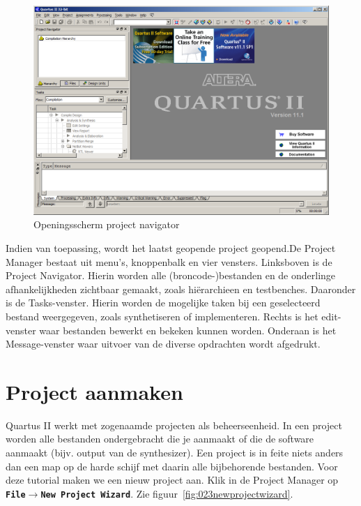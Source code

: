 \documentclass[a4paper,12pt,fleqn,twoside]{book}
\def\tutpicscale{0.455}
\newcommand{\menu}[1]{\texttt{\textbf{#1}}}
\def\pijl{$\rightarrow$}%
\begin{document}
\begin{figure}[H]
\centering
\includegraphics[scale=\tutpicscale]{022projectnavafterstartup.png}
\caption{Openingsscherm project navigator}
\label{fig:022projectnavafterstartup}
\end{figure}

Indien van toepassing, wordt het laatst geopende project geopend.De Project
Manager bestaat uit menu's, knoppenbalk en vier vensters. Linksboven is de
Project Navigator. Hierin worden alle (broncode-)bestanden en de onderlinge 
afhankelijkheden zichtbaar gemaakt, zoals hi\"{e}rarchieen en testbenches.
Daaronder is de Tasks-venster. Hierin worden de mogelijke taken bij een
geselecteerd bestand weergegeven, zoals synthetiseren of implementeren. Rechts
is het edit-venster waar bestanden bewerkt en bekeken kunnen worden. Onderaan
is het Message-venster waar uitvoer van de diverse opdrachten wordt afgedrukt.

\section{Project aanmaken}
\label{sec:projectaanmaken}
Quartus II werkt met zogenaamde projecten als beheerseenheid. In een project
worden alle bestanden ondergebracht die je aanmaakt of die de software
aanmaakt (bijv. output van de synthesizer). Een project is in feite niets
anders dan een map op de harde schijf met daarin alle bijbehorende bestanden.
Voor deze tutorial maken we een nieuw project aan. Klik in de Project Manager
op \menu{File\pijl{}New Project Wizard}.
Zie figuur~\ref{fig:023newprojectwizard}.
 
\end{document}
